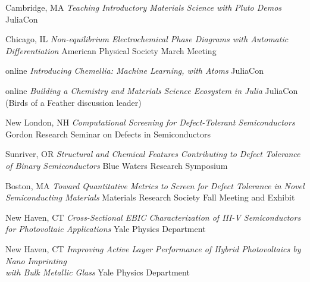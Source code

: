         {Cambridge, MA}
        {\textit{Teaching Introductory Materials Science with Pluto Demos}}
        {JuliaCon}

\vspace{-2mm}
	{Chicago, IL}
	{\textit{Non-equilibrium Electrochemical Phase Diagrams with Automatic Differentiation}}
    {American Physical Society March Meeting}

\vspace{-2mm}
	{online}
	{\textit{Introducing Chemellia: Machine Learning, with Atoms}}
    {JuliaCon}

\vspace{-3mm}
\datedsubsection{}
	{online}
	{\textit{Building a Chemistry and Materials Science Ecosystem in Julia}}
    {JuliaCon (Birds of a Feather discussion leader)}

\vspace{-2mm}
	{New London, NH}
	{\textit{Computational Screening for Defect-Tolerant Semiconductors}}
    {Gordon Research Seminar on Defects in Semiconductors}

\vspace{-3mm}
\datedsubsection{}
	{Sunriver, OR}
	{\textit{Structural and Chemical Features Contributing to Defect Tolerance of Binary Semiconductors}}
    {Blue Waters Research Symposium}

\vspace{-2mm}
    {Boston, MA}
    {\textit{Toward Quantitative Metrics to Screen for Defect Tolerance in Novel Semiconducting Materials}}
    {Materials Research Society Fall Meeting and Exhibit}

\vspace{-2mm}
    {New Haven, CT}
    {\textit{Cross-Sectional EBIC Characterization of III-V Semiconductors for Photovoltaic Applications}}
    {Yale Physics Department}

\vspace{-2mm}
    {New Haven, CT}
    {\textit{Improving Active Layer Performance of Hybrid Photovoltaics by Nano Imprinting\\ with Bulk Metallic Glass}}
    {Yale Physics Department}
